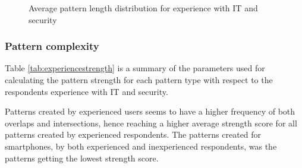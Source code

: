       \begin{figure}[H]
        \centering
        \caption{Average pattern length distribution for experience with IT and security}
        \label{fig:avgpatterndistexperience}
      \end{figure}

    \subsubsection{Pattern complexity}
    Table \ref{tab:experiencestrength} is a summary of the parameters used for calculating the pattern strength for each pattern type with respect to the respondents experience with IT and security. 

    Patterns created by experienced users seems to have a higher frequency of both overlaps and intersections, hence reaching a higher average strength score for all patterns created by experienced respondents. The patterns created for smartphones, by both experienced and inexperienced respondents, was the patterns getting the lowest strength score. 

